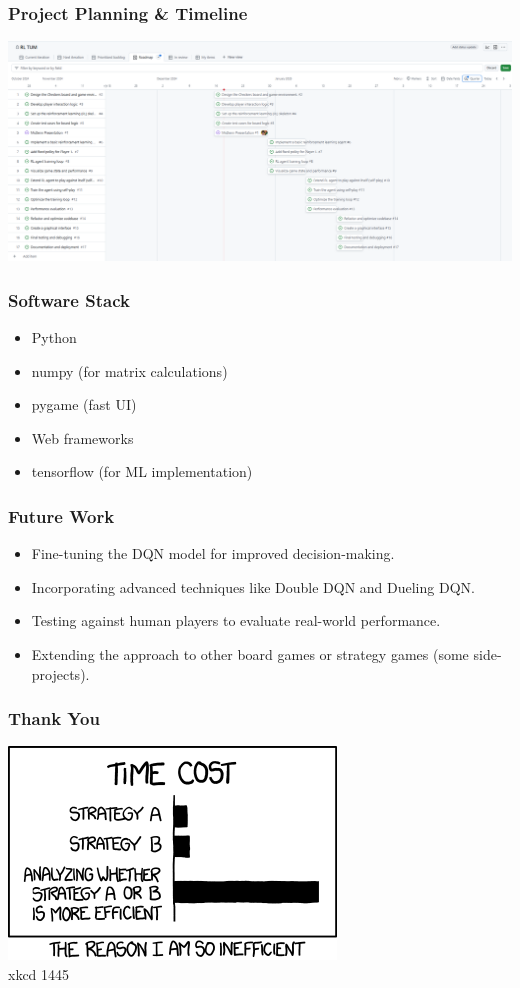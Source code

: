 
\begin{frame}
	\frametitle{Project Planning \& Timeline}
	\vspace{0.2cm}
	\includegraphics[scale=0.45]{project-plan}
\end{frame}

\begin{frame}
	\frametitle{Software Stack}
	\vspace{1cm}
	\begin{itemize}
		\item Python
		\item numpy (for matrix calculations)
		\item pygame (fast UI)
		\item Web frameworks
		\item tensorflow (for ML implementation)
	\end{itemize}	
\end{frame}

\begin{frame}
	\frametitle{Future Work}
	\vspace{0.5cm}
	\begin{itemize}
		\item Fine-tuning the DQN model for improved decision-making.
		\item Incorporating advanced techniques like Double DQN and Dueling DQN.
		\item Testing against human players to evaluate real-world performance.
		\item Extending the approach to other board games or strategy games (some side-projects).
	\end{itemize}
\end{frame}


\begin{frame}
	\frametitle{Thank You}
	\vspace{1cm}
	\centering
	\includegraphics{efficiency} \\
	xkcd 1445
\end{frame}






